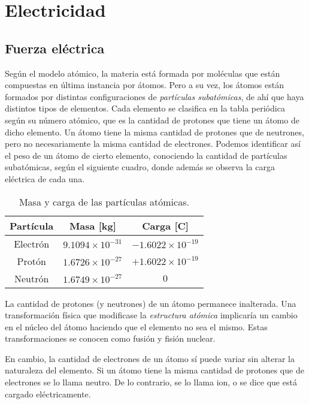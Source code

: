 \chapter{Electricidad}

\section{Fuerza eléctrica}

Según el modelo atómico, la materia está formada por moléculas que están compuestas en última instancia por átomos.
Pero a su vez, los átomos están formados por distintas configuraciones de \emph{partículas subatómicas}, de ahí que haya distintos tipos de elementos.
Cada elemento se clasifica en la tabla periódica según su número atómico, que es la cantidad de protones que tiene un átomo de dicho elemento.
Un átomo tiene la misma cantidad de protones que de neutrones, pero no necesariamente la misma cantidad de electrones.
Podemos identificar así el peso de un átomo de cierto elemento, conociendo la cantidad de partículas subatómicas, según el siguiente cuadro, donde además se observa la carga eléctrica de cada una.

\begin{table}[h!]
    \begin{center}
        \begin{tabular}{|c|c|c|}
            \hline
            Partícula & Masa [\si{\kilo\gram}] & Carga [\si{\coulomb}]
            \\ \hline \hline
            Electrón & $9.1094 \times 10^{-31}$ & $-1.6022 \times 10^{-19}$
            \\ \hline
            Protón & $1.6726 \times 10^{-27}$ & $+1.6022 \times 10^{-19}$
            \\ \hline
            Neutrón & $1.6749 \times 10^{-27}$ & $0$
            \\ \hline
        \end{tabular}
        \caption{Masa y carga de las partículas atómicas.}
    \end{center}
\end{table}

La cantidad de protones (y neutrones) de un átomo permanece inalterada.
Una transformación física que modificase la \emph{estructura atómica} implicaría un cambio en el núcleo del átomo haciendo que el elemento no sea el mismo.
Estas transformaciones se conocen como fusión y fisión nuclear.

En cambio, la cantidad de electrones de un átomo sí puede variar sin alterar la naturaleza del elemento.
Si un átomo tiene la misma cantidad de protones que de electrones se lo llama neutro.
De lo contrario, se lo llama ion, o se dice que está cargado eléctricamente.

